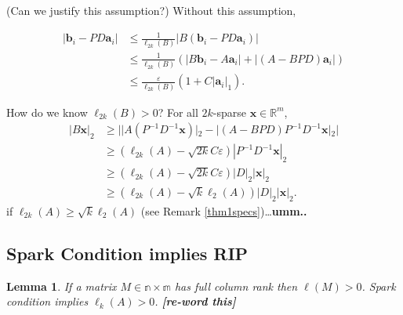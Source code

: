 \documentclass[journal, onecolumn]{IEEEtran}
\newtheorem{lemma}{Lemma}
\begin{document}
(Can we justify this assumption?) Without this assumption,

\begin{align*}
|\mathbf{b}_i - PD\mathbf{a}_i| 
&\leq \frac{1}{\ell_{2k}(B)}|B(\mathbf{b}_i - PD\mathbf{a}_i)| \\
&\leq \frac{1}{\ell_{2k}(B)} (|B\mathbf{b}_i - A\mathbf{a}_i| + |(A - BPD)\mathbf{a}_i|) \\
&\leq \frac{\varepsilon}{\ell_{2k}(B)}(1+C|\mathbf{a}_i|_1).
\end{align*}

How do we know $\ell_{2k}(B) > 0$? For all $2k$-sparse $\mathbf{x} \in \mathbb{R}^m$,
\begin{align*}
|B\mathbf{x}|_2 
&\geq | |A(P^{-1}D^{-1}\mathbf{x})|_2 - |(A-BPD)P^{-1}D^{-1}\mathbf{x}|_2 | \\
&\geq (\ell_{2k}(A) - \sqrt{2k}C\varepsilon)|P^{-1}D^{-1}\mathbf{x}|_2 \\
&\geq (\ell_{2k}(A) - \sqrt{2k}C\varepsilon)|D|_2|\mathbf{x}|_2 \\
&\geq (\ell_{2k}(A) - \sqrt{k}\ell_2(A))|D|_2|\mathbf{x}|_2. 
\end{align*}
%
if $\ell_{2k}(A) \geq \sqrt{k}\ell_2(A)$ (see Remark \ref{thm1specs})\ldots\textbf{umm..} 

\subsection{Spark Condition implies RIP}

\begin{lemma}
If a matrix $M \in \mathbb{n \times m}$ has full column rank then $\ell(M) > 0$. Spark condition implies $\ell_k(A) > 0$. \textbf{[re-word this]}
\end{lemma}
\end{document}
